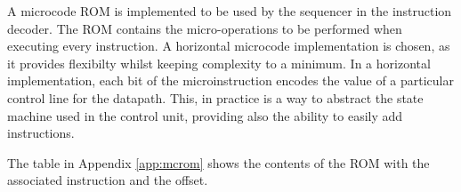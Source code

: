 \label{subsec:microcode_rom}
A microcode ROM is implemented to be used by the sequencer in the instruction
decoder. The ROM contains the micro-operations to be performed when executing
every instruction. A horizontal microcode implementation is chosen, as it
provides flexibilty whilst keeping complexity to a minimum. In a horizontal
implementation, each bit of the microinstruction encodes the value of a
particular control line for the datapath. This, in practice is a way to
abstract the state machine used in the control unit, providing also the ability
to easily add instructions.\par

The table in Appendix \ref{app:mcrom} shows the contents of
the ROM with the associated instruction and the offset.
